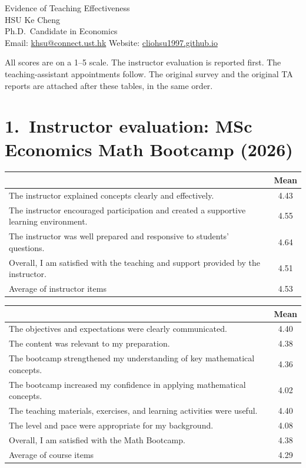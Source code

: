 \documentclass[11pt]{article}
\begin{document}
\begin{center}
{\Large Evidence of Teaching Effectiveness}\\[0.4em]
HSU Ke Cheng\\
Ph.D.\ Candidate in Economics\\[0.2em]
{\small Email: \href{mailto:khsu@connect.ust.hk}{khsu@connect.ust.hk}
\quad Website: \href{https://cliohsu1997.github.io/}{cliohsu1997.github.io}}
\end{center}

All scores are on a 1--5 scale. The instructor evaluation is reported first. The teaching-assistant appointments follow. The original survey and the original TA reports are attached after these tables, in the same order.

\section*{1.\ Instructor evaluation: MSc Economics Math Bootcamp (2026)}

{\small
\begin{tabularx}{\textwidth}{@{}X c@{}}
\toprule
& Mean \\
\midrule
The instructor explained concepts clearly and effectively. & 4.43 \\
The instructor encouraged participation and created a supportive learning environment. & 4.55 \\
The instructor was well prepared and responsive to students' questions. & 4.64 \\
Overall, I am satisfied with the teaching and support provided by the instructor. & 4.51 \\
\midrule
Average of instructor items & 4.53 \\
\bottomrule
\end{tabularx}
}

\vspace{0.35em}
{\small
\begin{tabularx}{\textwidth}{@{}X c@{}}
\toprule
& Mean \\
\midrule
The objectives and expectations were clearly communicated. & 4.40 \\
The content was relevant to my preparation. & 4.38 \\
The bootcamp strengthened my understanding of key mathematical concepts. & 4.36 \\
The bootcamp increased my confidence in applying mathematical concepts. & 4.02 \\
The teaching materials, exercises, and learning activities were useful. & 4.40 \\
The level and pace were appropriate for my background. & 4.08 \\
Overall, I am satisfied with the Math Bootcamp. & 4.38 \\
\midrule
Average of course items & 4.29 \\
\bottomrule
\end{tabularx}
}
\end{document}
